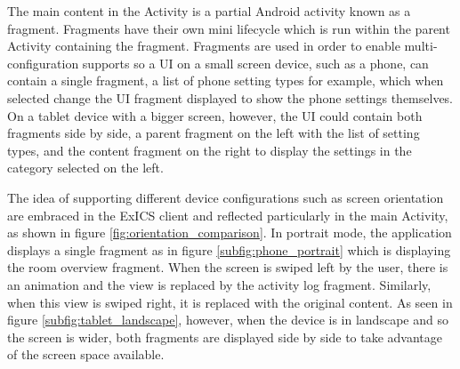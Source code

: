 The main content in the Activity is a partial Android activity known as a fragment.  Fragments have their own mini lifecycle\cite{visualisefragmentlifecycle} which is run within the parent Activity containing the fragment.  Fragments are used in order to enable multi-configuration supports so a UI on a small screen device, such as a phone, can contain a single fragment, a list of phone setting types for example, which when selected change the UI fragment displayed to show the phone settings themselves.  On a tablet device with a bigger screen, however, the UI could contain both fragments side by side, a parent fragment on the left with the list of setting types, and the content fragment on the right to display the settings in the category selected on the left.

\FloatBarrier

\FloatBarrier

The idea of supporting different device configurations such as screen orientation are embraced in the ExICS client and reflected particularly in the main Activity, as shown in figure \ref{fig:orientation_comparison}.  In portrait mode, the application displays a single fragment as in figure \ref{subfig:phone_portrait} which is displaying the room overview fragment.  When the screen is swiped left by the user, there is an animation and the view is replaced by the activity log fragment.  Similarly, when this view is swiped right, it is replaced with the original content.  As seen in figure \ref{subfig:tablet_landscape}, however, when the device is in landscape and so the screen is wider, both fragments are displayed side by side to take advantage of the screen space available.

